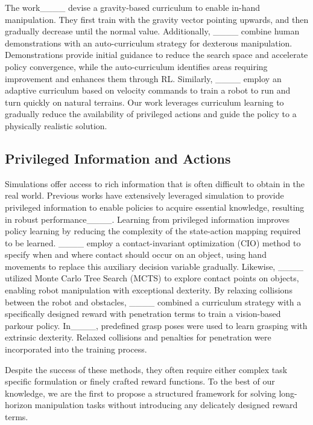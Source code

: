 The work____ devise a gravity-based curriculum to enable in-hand manipulation. They first train with the gravity vector pointing upwards, and then gradually decrease until the normal value. Additionally, ____ combine human demonstrations with an auto-curriculum strategy for dexterous manipulation. Demonstrations provide initial guidance to reduce the search space and accelerate policy convergence, while the auto-curriculum identifies areas requiring improvement and enhances them through RL. Similarly, ____ employ an adaptive curriculum based on velocity commands to train a robot to run and turn quickly on natural terrains. Our work leverages curriculum learning to gradually reduce the availability of privileged actions and guide the policy to a physically realistic solution. 

 








\subsection{Privileged Information and Actions}
Simulations offer access to rich information that is often difficult to obtain in the real world.
Previous works have extensively leveraged simulation to provide privileged information to enable policies to acquire essential knowledge, resulting in robust performance____. Learning from privileged information improves policy learning by reducing the complexity of the state-action mapping required to be learned.
____ employ a contact-invariant optimization (CIO) method to specify when and where contact should occur on an object, using hand movements to replace this auxiliary decision variable gradually. Likewise, ____ utilized Monte Carlo Tree Search (MCTS) to explore contact points on objects, enabling robot manipulation with exceptional dexterity. 
By relaxing collisions between the robot and obstacles, ____ combined a curriculum strategy with a specifically designed reward with penetration terms to train a vision-based parkour policy.
In____, predefined grasp poses were used to learn grasping with extrinsic dexterity. Relaxed collisions and penalties for penetration were incorporated into the training process.

Despite the success of these methods, they often require either complex task specific formulation or finely crafted reward functions. To the best of our knowledge, we are the first to propose a structured framework for solving long-horizon manipulation tasks without introducing any delicately designed reward terms.